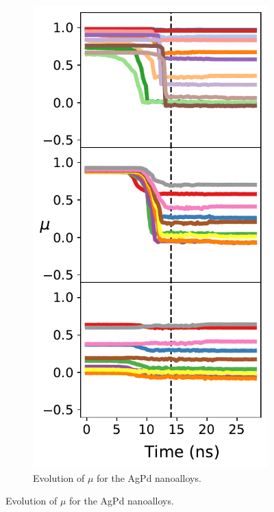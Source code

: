 \begin{figure}
\begin{subfigure}{0.39\textwidth}
    \centering
    \smallskip
    \includegraphics[width=\linewidth]{figures/MD/Alloys/Mix_Ag-Pd.pdf}
    \caption{Evolution of $\mu$ for the AgPd nanoalloys.}
    \label{fig:AgPdMix}

\end{subfigure}
\end{figure}
